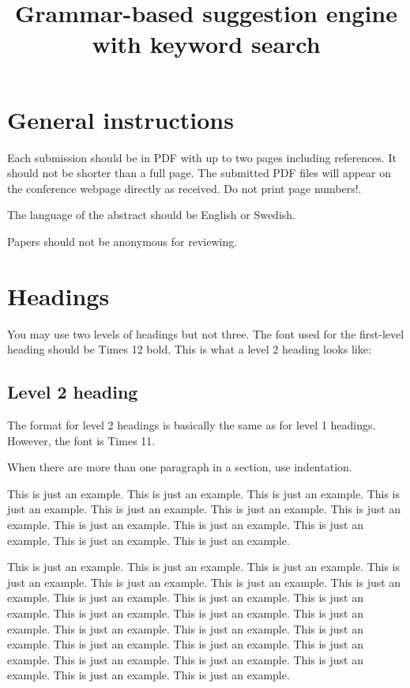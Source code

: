 \documentclass[10pt, a4paper]{article}
\title{Grammar-based suggestion engine with keyword search}
\begin{document}
\maketitleabstract

\section{General instructions}

Each submission should be in PDF with up to two pages including references. It should not be shorter than a full page. The submitted PDF files will appear on the conference webpage directly as received. Do not print page numbers!.

The language of the abstract should be English or Swedish.

Papers should not be anonymous for reviewing.


\section{Headings}

You may use two levels of headings but not three. The font used for the first-level heading should be Times 12 bold. This is what a level 2 heading looks like:

\subsection{Level 2 heading}
The format for level 2 headings is basically the same as for level 1 headings. However, the font is Times 11.

When there are more than one paragraph in a section, use indentation.

This is just an example. This is just an example. This is just an example. This is just an example. This is just an example. This is just an example. This is just an example. This is just an example. This is just an example. This is just an example. This is just an example. This is just an example.

This is just an example. This is just an example. This is just an example. This is just an example. This is just an example. This is just an example. This is just an example. This is just an example. This is just an example. This is just an example. This is just an example. This is just an example. This is just an example. This is just an example. This is just an example. This is just an example. This is just an example. This is just an example. This is just an example. This is just an example. This is just an example. This is just an example. This is just an example. This is just an example.
\end{document}
